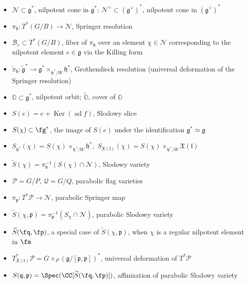 \documentclass[12pt]{amsart}
\begin{document}
\begin{itemize}
    \item $\mathcal{N} \subset \mathfrak{g}^*$, nilpotent cone in $\mathfrak{g}^*$; $\mathcal{N}^\vee \subset (\mathfrak{g}^\vee)^*$, nilpotent cone in $(\mathfrak{g}^\vee)^*$  
    \item $\pi_{\mathfrak{b}}\colon T^*(G/B) \rightarrow \mathcal{N}$, Springer resolution 
    \item $\mathcal{B}_e \subset T^*(G/B)$, fiber of $\pi_{\mathfrak{b}}$ over an  element $\chi \in \mathcal{N}$ corresponding to the nilpotent element $e \in \mathfrak{g}$ via the Killing form
    \item $\widetilde{\pi}_{\mathfrak{b}}\colon \widetilde{\mathfrak{g}}^* \rightarrow \mathfrak{g}^* \times_{\mathfrak{h}^*/W} \mathfrak{h}^*$, Grothendieck resolution (universal deformation of the Springer resolution)
    \item ${\mathbb{O}} \subset \mathfrak{g}^*$, nilpotent orbit; $\widetilde{\mathbb{O}}$, cover of ${\mathbb{O}}$ 
    \item $S(e)=e+\operatorname{Ker}(\operatorname{ad} f)$, Slodowy slice
    \item $S(\chi)\subset \fg^*$, the image of $S(e)$ under the identification $\mathfrak{g}^* \simeq \mathfrak{g}$
    \item $S_{\mathfrak{h}^*}(\chi)=S(\chi) \times_{\mathfrak{h}^*/W} \mathfrak{h}^*$,~$S_{\mathfrak{X}(\mathfrak{l})}(\chi)=S(\chi) \times_{\mathfrak{h}^*/W} \mathfrak{X}(\mathfrak{l})$
    \item $\widetilde{S}(\chi)=\pi_{\mathfrak{b}}^{-1}(S(\chi) \cap \mathcal{N})$, Slodowy variety
    \item $\mathcal{P}=G/P$, $\mathcal{Q}=G/Q$, parabolic flag varieties
    \item $\pi_{\mathfrak{p}}\colon T^*\mathcal{P} \rightarrow \mathcal{N}$, parabolic Springer map
    \item $\widetilde{S}(\chi,\mathfrak{p})=\pi_{\mathfrak{p}}^{-1}(S_\chi \cap \mathcal{N})$, parabolic Slodowy variety
    \item $\widetilde{S}(\fq, \fp)$, a special case of $\widetilde{S}(\chi,\mathfrak{p})$, when $\chi$ is a regular nilpotent element in $\fm$
    \item $T^*_{\mathfrak{X}(\mathfrak{l})}\mathcal{P}=G \times_{P} (\mathfrak{g}/[\mathfrak{p},\mathfrak{p}])^*$, universal deformation of $T^*\mathcal{P}$ 
    \item $S(\mathfrak{q},\mathfrak{p})=\Spec(\CC[\widetilde{S}(\fq, \fp)])$, affinization of parabolic Slodowy variety

\end{itemize}
\end{document}
